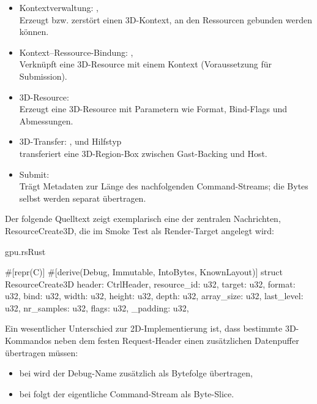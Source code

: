 \begin{itemize}
 \item Kontextverwaltung: , \\
 Erzeugt bzw. zerstört einen 3D-Kontext, an den Ressourcen gebunden werden können.
 \item Kontext–Ressource-Bindung: , \\
 Verknüpft eine 3D-Resource mit einem Kontext (Voraussetzung für Submission).
 \item 3D-Resource: \\
 Erzeugt eine 3D-Resource mit Parametern wie Format, Bind-Flags und Abmessungen.
 \item 3D-Transfer: ,  und Hilfstyp \\
 transferiert eine 3D-Region-Box zwischen Gast-Backing und Host.
 \item Submit: \\
 Trägt Metadaten zur Länge des nachfolgenden Command-Streams; die Bytes selbst werden separat übertragen.
\end{itemize}

Der folgende Quelltext zeigt exemplarisch eine der zentralen Nachrichten, ResourceCreate3D, die im Smoke Test als Render-Target angelegt wird:
\begin{codeblock}{gpu.rs}{Rust}
  \begin{rustcode}
#[repr(C)]
#[derive(Debug, Immutable, IntoBytes, KnownLayout)]
struct ResourceCreate3D {
    header: CtrlHeader,
    resource_id: u32,
    target: u32,
    format: u32,
    bind: u32,
    width: u32,
    height: u32,
    depth: u32,
    array_size: u32,
    last_level: u32,
    nr_samples: u32,
    flags: u32,
    _padding: u32,
}
  \end{rustcode}
\end{codeblock}

Ein wesentlicher Unterschied zur 2D-Implementierung ist, dass bestimmte 3D-Kommandos neben dem festen Request-Header einen zusätzlichen Datenpuffer übertragen müssen:

\begin{itemize}
 \item bei  wird der Debug-Name zusätzlich als Bytefolge übertragen,
 \item bei  folgt der eigentliche Command-Stream als Byte-Slice.
\end{itemize}

